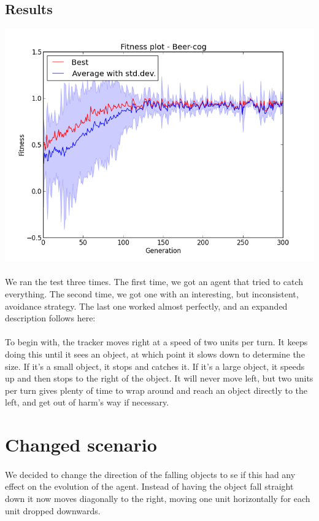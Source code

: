 \documentclass[a4paper,12pt]{article}
\begin{document}
\subsection{Results}
\centerline{\includegraphics[width=1.0\textwidth]{mincog_fitness}}
\paragraph{}We ran the test three times. The first time, we got an agent that tried to catch everything. The second time, we got one with an interesting, but inconsistent, avoidance strategy. The last one worked almost perfectly, and an expanded description follows here:
\paragraph{}To begin with, the tracker moves right at a speed of two units per turn. It keeps doing this until it sees an object, at which point it slows down to determine the size. If it's a small object, it stops and catches it. If it's a large object, it speeds up and then stops to the right of the object. It will never move left, but two units per turn gives plenty of time to wrap around and reach an object directly to the left, and get out of harm's way if necessary.

\section{Changed scenario}
\paragraph{}We decided to change the direction of the falling objects to se if this had any effect on the evolution of the agent. Instead of having the object fall straight down it now moves diagonally to the right, moving one unit horizontally for each unit dropped downwards.
\end{document}
